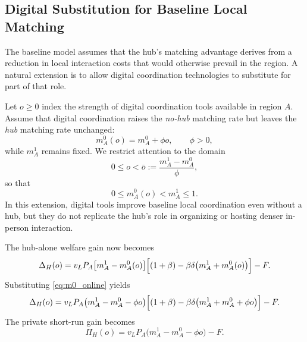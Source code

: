 \subsection{Digital Substitution for Baseline Local Matching}

The baseline model assumes that the hub's matching advantage derives from a reduction in local interaction costs that would otherwise prevail in the region. A natural extension is to allow digital coordination technologies to substitute for part of that role.

Let $o\ge 0$ index the strength of digital coordination tools available in region $A$. Assume that digital coordination raises the \emph{no-hub} matching rate but leaves the \emph{hub} matching rate unchanged:
\begin{equation}
m_A^0(o)=m_A^0+\phi o,
\qquad
\phi>0,
\label{eq:m0_online}
\end{equation}
while $m_A^1$ remains fixed. We restrict attention to the domain
\begin{equation}
0\le o<\bar o:=\frac{m_A^1-m_A^0}{\phi},
\label{eq:o_domain}
\end{equation}
so that
\[
0\le m_A^0(o)<m_A^1\le 1.
\]
In this extension, digital tools improve baseline local coordination even without a hub, but they do not replicate the hub's role in organizing or hosting denser in-person interaction.

The hub-alone welfare gain now becomes
\begin{equation}
\Delta_H(o)
=
v_LP_A\bigl[m_A^1-m_A^0(o)\bigr]
\Bigl[(1+\beta)-\beta\delta\bigl(m_A^1+m_A^0(o)\bigr)\Bigr]-F.
\label{eq:DeltaH_o}
\end{equation}
Substituting \eqref{eq:m0_online} yields
\begin{equation}
\Delta_H(o)
=
v_LP_A\bigl(m_A^1-m_A^0-\phi o\bigr)
\Bigl[(1+\beta)-\beta\delta\bigl(m_A^1+m_A^0+\phi o\bigr)\Bigr]-F.
\label{eq:DeltaH_o_expanded}
\end{equation}
The private short-run gain becomes
\begin{equation}
\Pi_H(o)
=
v_LP_A\bigl(m_A^1-m_A^0-\phi o\bigr)-F.
\label{eq:PiH_o}
\end{equation}

